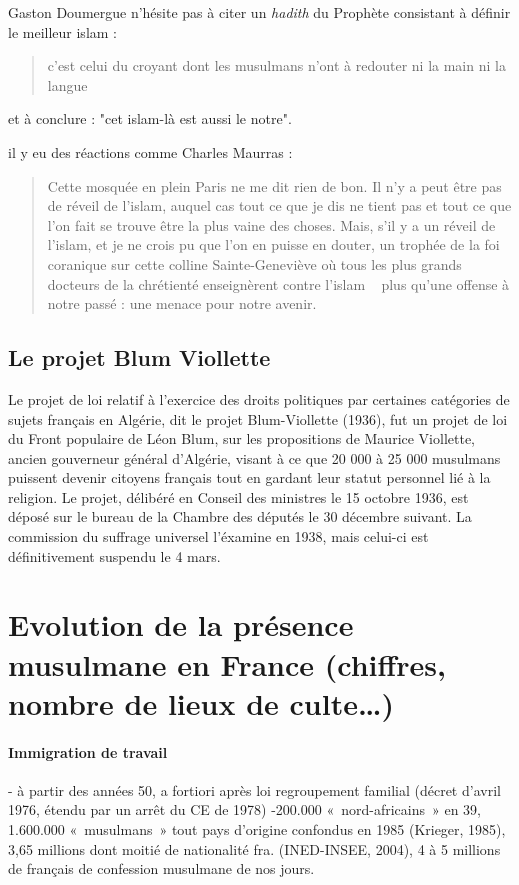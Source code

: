 Gaston Doumergue n'hésite pas à citer un \emph{hadith} du Prophète consistant à définir le meilleur islam : 
\begin{quote}
    c'est celui du croyant dont les musulmans n'ont à redouter ni la main ni la langue
\end{quote}
et à conclure : "cet islam-là est aussi le notre".


il y eu des réactions comme Charles Maurras : 
\begin{quote}
    Cette mosquée en plein Paris ne me dit rien de
bon. Il n'y a peut être pas de réveil de l'islam, auquel cas tout ce
que je dis ne tient pas et tout ce que l'on fait se trouve être la plus vaine des choses. Mais, s'il y a un réveil de l'islam, et je ne
crois pu que l'on en puisse en douter, un trophée de la foi coranique sur cette colline Sainte-Geneviève où tous les plus grands docteurs
de la chrétienté enseignèrent contre l'islam ~ plus
qu'une offense à notre passé : une menace pour notre avenir. 
\end{quote}



\subsection{Le projet Blum Viollette}
Le projet de loi relatif à l'exercice des droits politiques par certaines catégories de sujets français en Algérie, dit le projet Blum-Viollette (1936), fut un projet de loi du Front populaire de Léon Blum, sur les propositions de Maurice Viollette, ancien gouverneur général d'Algérie, visant à ce que 20 000 à 25 000 musulmans puissent devenir citoyens français tout en gardant leur statut personnel lié à la religion. Le projet, délibéré en Conseil des ministres le 15 octobre 1936, est déposé sur le bureau de la Chambre des députés le 30 décembre suivant. La commission du suffrage universel l'éxamine en 1938, mais celui-ci est définitivement suspendu le 4 mars.


\section{Evolution de la présence musulmane en France (chiffres, nombre de lieux de
culte…)}

\paragraph{Immigration de travail}
- à partir des années 50, a fortiori après loi regroupement familial (décret d’avril 1976, étendu par un arrêt du CE de 1978)
-200.000 « nord-africains » en 39, 1.600.000 « musulmans » tout pays d’origine confondus en 1985 (Krieger, 1985), 3,65 millions dont moitié de nationalité fra. (INED-INSEE, 2004), 4 à 5 millions de français de confession musulmane de nos jours.

